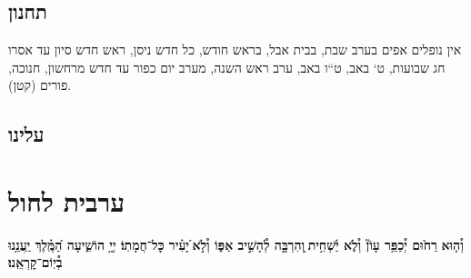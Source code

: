 \documentclass[twoside, openany, parskip=half, 11pt]{book}
\begin{document}
\section*{ תחנון }

\begin{scriptsize}
\textsf{אין נופלים אפים בערב שבת, בבית אבל, בראש חודש, כל חדש ניסן, ראש חדש סיון עד אסרו חג שבועות, ט` באב, ט``ו באב, ערב ראש השנה, מערב יום כפור עד חדש מרחשון, חנוכה, פורים (קטן).}

\end{scriptsize}


\nefilasapayim

\shomeryisroel

\fullkaddish

\label{mincha aleinu}
\section*{ עלינו }

\aleinu
\mournerskaddish

\vfill

\quad{}\quad{}

\chapter[ערבית לחול]{ ערבית לחול }

\textbf{וְ֯ה֤וּא}\textbf{
רַח֙וּם יְ֯כַפֵּ֥ר עָוֹן֘ וְ֯לֹ֢א יַ֫שְׁחִ֥ית ֖וְהִרְבָּ֣ה לְ֯הָשִׁ֣יב אַפּ֑וֹ וְ֯לֹ֣א ֝יָעִ֗יר כׇּל־חֲמָתֽוֹ׃ יְיָ֥ הוֹשִׁ֑יעָה הַ֝מֶּֽ֗לֶךְ יַֽעֲנֵ֥נוּ בְ֯יֽוֹם־קׇרְאֵֽנוּ׃}


\barachu

\newcommand{\hamaarivaravim}{
\firstword{בָּרוּךְ}
אַתָּה יְיָ אֱלֹהֵֽינוּ מֶֽלֶךְ הָעוֹלָם אֲשֶׁר בִּדְבָרוֹ מַעֲרִיב עֲרָבִים בְּ֯חׇכְמָה פּוֹתֵֽחַ שְׁ֯עָרִים וּבִתְבוּנָה מְ֯שַׁנֶּה עִתִּים וּמַחֲלִיף אֶת־הַזְּ֯מַנִּים וּמְסַדֵּר אֶת־הַכּוֹכָבִים בְּ֯מִשְׁמְ֯רוֹתֵֽיהֶם בָּרָקִֽיעַ כִּרְצוֹנוֹ׃ בּוֹרֵא יוֹם וָלָֽיְ֯לָה גּוֹלֵל אוֹר מִפְּ֯נֵי חֹֽשֶׁךְ וְ֯חֹֽשֶׁךְ מִפְּ֯נֵי אוֹר׃ וּמַעֲבִיר יוֹם וּמֵֽבִיא לָֽיְ֯לָה וּמַבְדִּיל בֵּין יוֹם וּבֵין לָֽיְ֯לָה יְיָ צְ֯בָאוֹת שְׁ֯מוֹ׃ אֵל חַי וְ֯קַיָּם תָּמִיד יִמְלוֹךְ עָלֵֽינוּ לְ֯עוֹלָם וָעֶד׃ בָּרוּךְ אַתָּה יְיָ הַמַּעֲרִיב עֲרָבִים׃
}

\newcommand{\ahavasolam}{
\firstword{אַהֲבַת}
עוֹלָם בֵּית יִשְׂרָאֵל עַמְּ֯ךָ אָהַבְתָּ׃ תּוֹרָה וּמִצְוֹת חֻקִּים וּמִשְׁפָּטִים אוֹתָֽנוּ לִמַֽדְתָּ׃ עַל כֵּן יְיָ אֱלֹהֵֽינוּ בְּ֯שׇׁכְבֵּֽנוּ וּבְקוּמֵֽנוּ נָשִֽׂיחַ בְּ֯חֻקֶּיךָ וְ֯נִשְׂמַח בְּ֯דִבְרֵי תוֹרָתֶֽךָ וּבְמִצְוֹתֶֽיךָ לְ֯עוֹלָם וָעֶד׃ כִּי הֵם חַיֵּֽינוּ וְ֯אֹֽרֶךְ יָמֵֽינוּ וּבָהֶם נֶהְגֶּה יוֹמָם וָלָֽיְ֯לָה׃ וְ֯אַהֲבָתְ֯ךָ אַל תָּסִיר מִמֶּֽנּוּ לְ֯עוֹלָמִים׃ בָּרוּךְ אַתָּה יְיָ אוֹהֵב, עַמּוֹ יִשְׂרָאֵל׃
}
\end{document}
